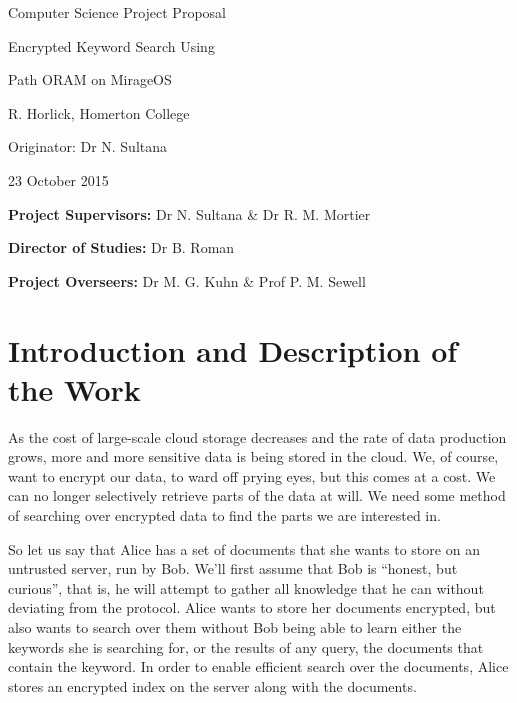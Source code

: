 \documentclass[12pt,a4paper,twoside]{article}
\begin{document}
\vfil

\centerline{\Large Computer Science Project Proposal}
\vspace{0.4in}
\centerline{\Large Encrypted Keyword Search Using}
\vspace{0.05in}
\centerline{\Large Path ORAM on MirageOS}
\vspace{0.4in}
\centerline{\large R. Horlick, Homerton College}
\vspace{0.3in}
\centerline{\large Originator: Dr N. Sultana}
\vspace{0.3in}
\centerline{\large 23 October 2015}

\vfil


\noindent
{\bf Project Supervisors:} Dr N. Sultana \& Dr R. M. Mortier
\vspace{0.2in}

\noindent
{\bf Director of Studies:} Dr B. Roman
\vspace{0.2in}
\noindent
 
\noindent
{\bf Project Overseers:} Dr M. G. Kuhn \& Prof P. M. Sewell



\section*{Introduction and Description of the Work}


As the cost of large-scale cloud storage decreases and the rate of data production grows, more and more sensitive data is being stored in the cloud. We, of course, want to encrypt our data, to ward off prying eyes, but this comes at a cost. We can no longer selectively retrieve parts of the data at will. We need some method of searching over encrypted data to find the parts we are interested in.


So let us say that Alice has a set of documents that she wants to store on an untrusted server, run by Bob. We'll first assume that Bob is ``honest, but curious'', that is, he will attempt to gather all knowledge that he can without deviating from the protocol. Alice wants to store her documents encrypted, but also wants to search over them without Bob being able to learn either the keywords she is searching for, or the results of any query, the documents that contain the keyword. In order to enable efficient search over the documents, Alice stores an encrypted index on the server along with the documents.
\end{document}
